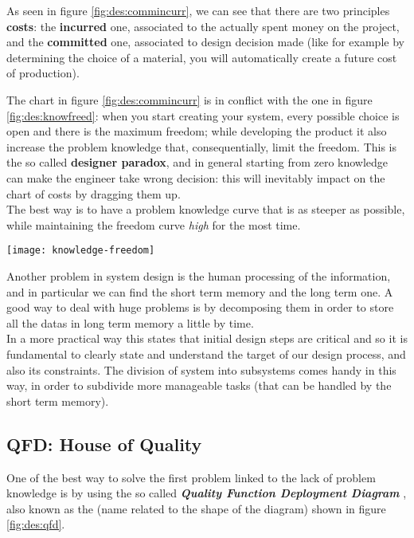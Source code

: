 	As seen in figure \ref{fig:des:commincurr}, we can see that there are two principles \textbf{costs}: the \textbf{incurred} one, associated to the actually spent money on the project, and the \textbf{committed} one, associated to design decision made (like for example by determining the choice of a material, you will automatically create a future cost of production).
	
	The chart in figure \ref{fig:des:commincurr} is in conflict with the one in figure \ref{fig:des:knowfreed}: when you start creating your system, every possible choice is open and there is the maximum freedom; while developing the product it also increase the problem knowledge that, consequentially, limit the freedom. This is the so called \textbf{designer paradox}, and in general starting from zero knowledge can make the engineer take wrong decision: this will inevitably impact on the chart of costs by dragging them up. \\
	The best way is to have a problem knowledge curve that is as steeper as possible, while maintaining the freedom curve \textit{high} for the most time.
			
	\begin{SCfigure}[1][bht]
		\centering
		\texttt{[image: knowledge-freedom]}
		\caption{design freedom and problem knowledge while designing a system.}
		\label{fig:des:knowfreed}
	\end{SCfigure}

	Another problem in system design is the human processing of the information, and in particular we can find the short term memory and the long term one. A good way to deal with huge problems is by decomposing them in order to store all the datas in long term memory a little by time.\\
	In a more practical way this states that initial design steps are critical and so it is fundamental to clearly state and understand the target of our design process, and also its constraints. The division of system into subsystems comes handy in this way, in order to subdivide more manageable tasks (that can be handled by the short term memory).
	
	\subsection{QFD: House of Quality}
		One of the best way to solve the first problem linked to the lack of problem knowledge is by using the so called \textbf{\textit{Quality Function Deployment Diagram}} , also known as the  (name related to the shape of the diagram) shown in figure \ref{fig:des:qfd}.
	
